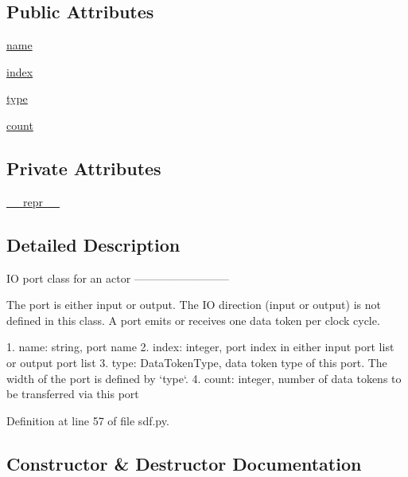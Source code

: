 \subsection*{Public Attributes}
\begin{DoxyCompactItemize}
\item 
\hyperlink{classsylva_1_1base_1_1sdf_1_1port_ace0eb23bb9f3e4a75e6a94f0961a6f99}{name}
\item 
\hyperlink{classsylva_1_1base_1_1sdf_1_1port_a4ed6db96ef0a6fb3d9b8f36c59bf7bdd}{index}
\item 
\hyperlink{classsylva_1_1base_1_1sdf_1_1port_af04b13138d55895bfd1083eb3e772f58}{type}
\item 
\hyperlink{classsylva_1_1base_1_1sdf_1_1port_a628b66dd64830393bcf8d88b85023016}{count}
\end{DoxyCompactItemize}
\subsection*{Private Attributes}
\begin{DoxyCompactItemize}
\item 
\hyperlink{classsylva_1_1base_1_1sdf_1_1port_a14e2fb1373bce5c98b5f779012db8a0b}{\+\_\+\+\_\+repr\+\_\+\+\_\+}
\end{DoxyCompactItemize}


\subsection{Detailed Description}
\begin{DoxyVerb}  IO port class for an actor
  --------------------------

  The port is either input or output.
  The IO direction (input or output) is not defined in this class.
  A port emits or receives one data token per clock cycle.

  1. name: string, port name
  2. index: integer, port index in either input port list or output port list
  3. type: DataTokenType, data token type of this port.
    The width of the port is defined by `type`.
  4. count: integer, number of data tokens to be transferred via this port
\end{DoxyVerb}
 

Definition at line 57 of file sdf.\+py.



\subsection{Constructor \& Destructor Documentation}
\mbox{\label{classsylva_1_1base_1_1sdf_1_1port_a648789838e7d9ff8d8cd26537ed006ad}} 
